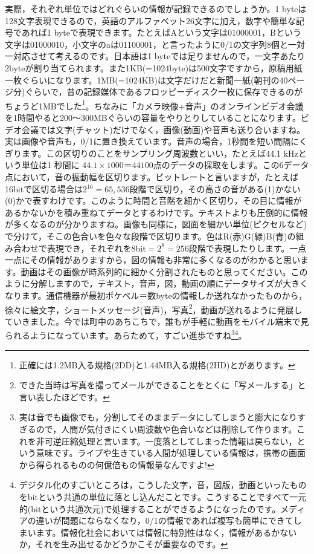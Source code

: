 \documentclass{ltjsbook}
\begin{document}
実際，それぞれ単位ではどれぐらいの情報が記録できるのでしょうか。1 byteは128文字表現できるので，英語のアルファベット26文字に加え，数字や簡単な記号であれば1 byteで表現できます。たとえばAという文字は01000001，Bという文字は01000010，小文字のaは01100001，と言ったように0/1の文字列8個と一対一対応させて考えるのです。日本語は1 byteでは足りませんので，一文字あたり2byteが割り当てられます。また1KB(=1024byte)は500文字ですから，原稿用紙一枚ぐらいになります。1MB(=1024KB)は文字だけだと新聞一紙(朝刊の40ページ分)ぐらいで，昔の記録媒体であるフロッピーディスク一枚に保存できるのがちょうど1MBでした\footnote{正確には1.2MB入る規格(2DD)と1.44MB入る規格(2HD)とがあります。}。ちなみに「カメラ映像+音声」のオンラインビデオ会議を1時間やると200〜300MBぐらいの容量をやりとりしていることになります。ビデオ会議では文字(チャット)だけでなく，画像(動画)や音声も送り合いますね。実は画像や音声も，0/1に置き換えています。音声の場合，1秒間を短い間隔にくぎります。この区切りのことをサンプリング周波数といい，たとえば44.1 kHzという単位は1 秒間に $44.1 \times 1000 ＝ 44100$点のデータの採取をします。この6データ点において，音の振動幅を区切ります。ビットレートと言いますが，たとえば16bitで区切る場合は2$^16=65,536$段階で区切り，その高さの音がある(1)かない(0)かで表すわけです。このように時間と音階を細かく区切り，その目に情報があるかないかを積み重ねてデータとするわけです。テキストよりも圧倒的に情報が多くなるのが分かりますね。画像も同様に，図面を細かい単位(ピクセルなど)で分けて，そこの色合いを色々な段階で区切ります。色はR(赤)G(緑)B(青)の組み合わせで表現でき，それぞれを8bit$=2^8=256$段階で表現したりします。一点一点にその情報がありますから，図の情報も非常に多くなるのがわかると思います。動画はその画像が時系列的に細かく分割されたものと思ってください。このように分解しますので，テキスト，音声，図，動画の順にデータサイズが大きくなります。通信機器が最初ポケベル＝数byteの情報しか送れなかったものから，徐々に絵文字，ショートメッセージ(音声)，写真\footnote{できた当時は写真を撮ってメールができることをとくに「写メールする」と言い表したほどです。}，動画が送れるように発展していきました。今では町中のあちこちで，誰もが手軽に動画をモバイル端末で見られるようになっています。あらためて，すごい進歩ですね\footnote{実は音でも画像でも，分割してそのままデータにしてしまうと膨大になりすぎるので，人間が気付きにくい周波数や色合いなどは削除して作ります。これを非可逆圧縮処理と言います。一度落としてしまった情報は戻らない，という意味です。ライブや生きている人間が処理している情報は，携帯の画面から得られるものの何億倍もの情報量なんですよ!}\footnote{デジタル化のすごいところは，こうした文字，音，図版，動画といったものをbitという共通の単位に落とし込んだことです。こうすることですべて一元的(bitという共通次元)で処理することができるようになったのです。メディアの違いが問題にならなくなり，0/1の情報であれば複写も簡単にできてしまいます。情報化社会においては情報に特別性はなく，情報があるかないか，それを生み出せるかどうかこそが重要なのです。}。
\end{document}
